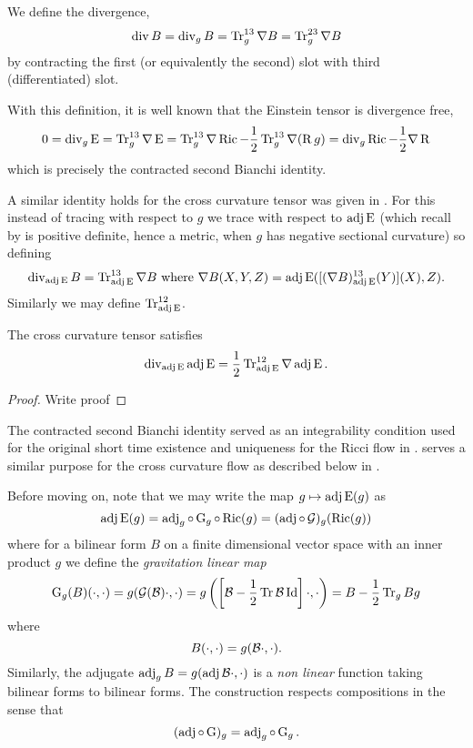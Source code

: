 \documentclass[a4paper, 12pt]{amsart}
\begin{document}
We define the divergence,
\[
\operatorname{div} B = \operatorname{div}_g B = \operatorname{Tr}_g^{13} \nabla B = \operatorname{Tr}_g^{23} \nabla B
\]
by contracting the first (or equivalently the second) slot with third (differentiated) slot.

With this definition, it is well known that the Einstein tensor is divergence free,
\begin{equation}
\label{eq:ein_divfree}
0 = \operatorname{div}_g \operatorname{E} = \operatorname{Tr}_g^{13} \nabla \operatorname{E} = \operatorname{Tr}_g^{13} \nabla \operatorname{Ric} - \frac{1}{2} \operatorname{Tr}_g^{13} \nabla (\operatorname{R} g) = \operatorname{div}_g \operatorname{Ric} - \frac{1}{2} \nabla \operatorname{R}
\end{equation}
which is precisely the contracted second Bianchi identity.

A similar identity holds for the cross curvature tensor was given in \cite[Lemma 1]{MR2055396}. For this instead of tracing with respect to \(g\) we trace with respect to \(\operatorname{adj}\operatorname{E}\) (which recall by  is positive definite, hence a metric, when \(g\) has negative sectional curvature) so defining
\[
\operatorname{div}_{\operatorname{adj}\operatorname{E}} B = \operatorname{Tr}_{\operatorname{adj}\operatorname{E}}^{13} \nabla B \text{ where } \nabla B(X, Y, Z) = \operatorname{adj}\operatorname{E}([(\nabla B)_{\operatorname{adj}\operatorname{E}}^{13}(Y)] (X), Z).
\]
Similarly we may define \(\operatorname{Tr}_{\operatorname{adj}\operatorname{E}}^{12}\).

\begin{lemma}
\label{lem:xcf_hamilton_integrability}
The cross curvature tensor satisfies
\[
\operatorname{div}_{\operatorname{adj}\operatorname{E}} \operatorname{adj}\operatorname{E} = \frac{1}{2} \operatorname{Tr}^{12}_{\operatorname{adj}\operatorname{E}} \nabla \operatorname{adj}\operatorname{E}.
\]
\end{lemma}

\begin{proof}
{\color{red}Write proof}
\end{proof}

The contracted second Bianchi identity served as an integrability condition used for the original short time existence and uniqueness for the Ricci flow in \cite{Hamilton:/1982}.  serves a similar purpose for the cross curvature flow as described below in .

Before moving on, note that we may write the map \(g \mapsto \operatorname{adj}\operatorname{E}(g)\) as
\[
\operatorname{adj}\operatorname{E}(g) = \operatorname{adj}_g \circ \operatorname{G}_g \circ \operatorname{Ric} (g) = (\operatorname{adj} \circ \operatorname{\mathcal{G}})_g (\operatorname{Ric}(g))
\]
where for a bilinear form \(B\) on a finite dimensional vector space with an inner product \(g\) we define the \emph{gravitation linear map}
\[
\operatorname{G}_g(B) (\cdot, \cdot) = g(\operatorname{\mathcal{G}}(\mathcal{B}) \cdot, \cdot) = g\left(\left[\mathcal{B} - \frac{1}{2} \operatorname{Tr}\mathcal{B} \operatorname{Id}\right] \cdot, \cdot\right) = B - \frac{1}{2} \operatorname{Tr}_g B g
\]
where
\[
B(\cdot, \cdot) = g(\mathcal{B} \cdot, \cdot).
\]
Similarly, the adjugate \(\operatorname{adj}_g B = g(\operatorname{adj}\mathcal{B} \cdot, \cdot)\) is a \emph{non linear} function taking bilinear forms to bilinear forms. The construction respects compositions in the sense that
\[
(\operatorname{adj} \circ \operatorname{G})_g = \operatorname{adj}_g \circ \operatorname{G}_g.
\]
\end{document}
